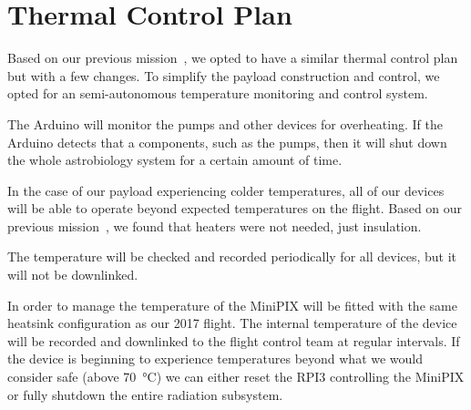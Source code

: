 \section{Thermal Control Plan}
\label{sec:TCP}
Based on our previous mission~\cite{SORA}, we opted to have a similar thermal control plan but with a few changes.  To simplify the payload construction and control, we opted for an semi-autonomous temperature monitoring and control system.  

The Arduino will monitor the pumps and other devices for overheating.  If the Arduino detects that a components, such as the pumps, then it will shut down the whole astrobiology system for a certain amount of time.

In the case of our payload experiencing colder temperatures, all of our devices will be able to operate beyond expected temperatures on the flight. Based on our previous mission~\cite{SORA}, we found that heaters were not needed, just insulation.

The temperature will be checked and recorded periodically for all devices, but it will not be downlinked.

In order to manage the temperature of the  MiniPIX will be fitted with the same heatsink configuration as our 2017 flight. The internal temperature of the device will be recorded and downlinked to the flight control team at regular intervals. If the device is beginning to experience temperatures beyond what we would consider safe (above \SI{70}{\celsius}) we can either reset the RPI3 controlling the MiniPIX or fully shutdown the entire radiation subsystem.

